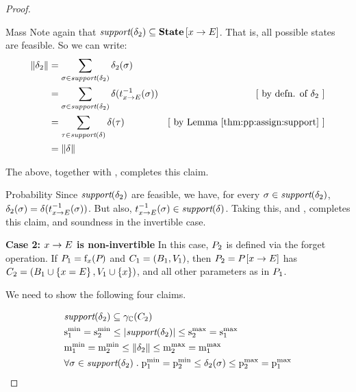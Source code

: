 \begin{proof}
\begin{subproof}{ Mass} Note again that
$ \textit{support}(\delta_2) \subseteq \textbf{State} \left[ x \rightarrow E \right] $. That is,
all possible states are feasible. So we can write:
\begin{align*}
\pmass{\delta_2} & = \sum_{\sigma \in \support{\delta_2}} \delta_2
(\sigma) \\
 & = \sum_{\sigma \in \support{\delta_2}} \delta
 ( \funinvassign{x}{E}(\sigma) ) & \mathstep{by defn. of $ \delta_2
 $} \\
 & = \sum_{\tau \in \support{\delta}} \delta (\tau) & \mathstep{by \lref{thm:pp:assign:support}} \\
 & = \pmass{\delta}
\end{align*}

The above, together with , completes
this claim.
\end{subproof}

\begin{subproof}{ Probability} Since
$ \textit{support}(\delta_2) $ are feasible, we have, for every
$ \sigma \in \textit{support}(\delta_2) $, $ \delta_2(\sigma)
= \delta(t_{x \rightarrow E}^{-1}(\sigma)) $. But also,
$ t_{x \rightarrow E}^{-1}(\sigma) \in \textit{support}(\delta) $. Taking this,
and , completes this claim, and
soundness in the invertible case.
\end{subproof}

\textbf{Case 2: $ x \rightarrow E $ is non-invertible} In this case,
$ P_{2} $ is defined via the forget operation. If $ P_{1}
= \mathrm{f}_{x}(P_{}) $ and $ C_1 = (B_1, V_1) $, then $ P_{2}
= P_{} \left[ x \rightarrow E \right] $ has $ C_{2} = (B_1 \cup \left\{ x =
E \right\}, V_1 \cup \left\{ x \right\}) $, and all other parameters as in $ P_{1} $.

We need to show the following four claims.

\begin{align}
\label{thm:pp:assign:cond1b}& \support{\delta_2} \subseteq \pconc{\getpoly{2}} \\
\label{thm:pp:assign:cond2b}& \smin{1}
= \smin{2} \leq \setsize{\support{\delta_2}} \leq \smax{2} = \smax{1} \\
\label{thm:pp:assign:cond3b}& \mmin{1}
= \mmin{2} \leq \pmass{\delta_2} \leq \mmax{2} = \mmax{1} \\
\label{thm:pp:assign:cond4b}& \forall \sigma \in \support{\delta_2} \;
. \; \pmin{1} = \pmin{2} \leq \delta_2(\sigma) \leq \pmax{2} = \pmax{1}
\end{align}


\end{proof}
